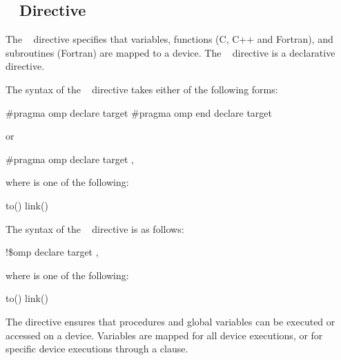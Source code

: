 \subsection{~ Directive}
\label{subsec:declare target Directive}
\summary
The ~ directive specifies that variables, 
functions (C, C++ and Fortran), and subroutines (Fortran) are mapped 
to a device. The ~ directive is a declarative 
directive.

\syntax
\ccppspecificstart
The syntax of the ~ directive takes either of 
the following forms:

\begin{boxedcode}
\#pragma omp declare target 
\#pragma omp end declare target 
\end{boxedcode}

or

\begin{boxedcode}
\#pragma omp declare target \plc{clause[ [},\plc{] clause] ... ] new-line}
\end{boxedcode}

where  is one of the following:

\begin{indentedcodelist}
\plc{[}to\plc{]}()
link()
\end{indentedcodelist}
\ccppspecificend

\fortranspecificstart
The syntax of the ~ directive is as follows:

\begin{boxedcode}
!\$omp declare target \plc{[clause[ [},\plc{] clause] ... ]} 
\end{boxedcode}

where  is one of the following:

\begin{indentedcodelist}
\plc{[}to\plc{]}()
link()
\end{indentedcodelist}
\fortranspecificend

\descr

The   directive ensures that procedures
and global variables can be executed or accessed on a device.
Variables are mapped for all device executions, or for specific
device executions through a  clause.

